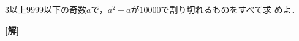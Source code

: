 \documentclass[a4j]{jarticle}
\begin{document}

\preEqlabel{$\cdots$}
      \begin{oframed}
       $3$以上$9999$以下の奇数$a$で，$a^2-a$が$10000$で割り切れるものをすべて求
       めよ．
      \end{oframed}

     \setlength{\columnseprule}{0.4pt}
     \begin{multicols}{2}
     {\bf[解]}

	  \newpage
	  \end{multicols}
	  
\end{document}
